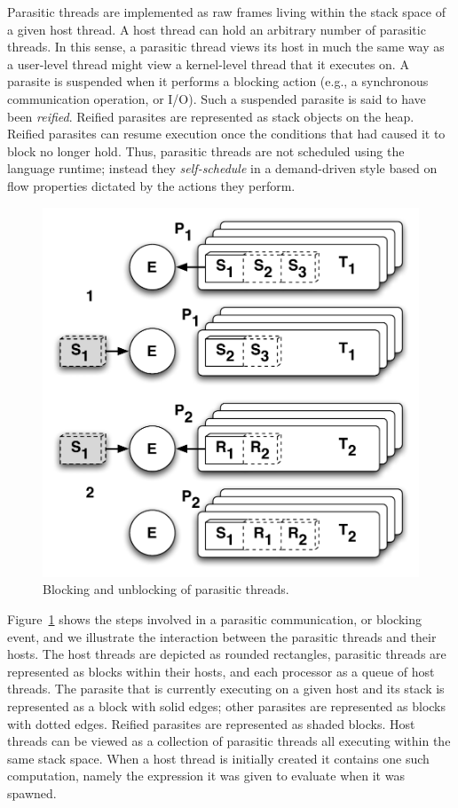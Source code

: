 Parasitic threads are implemented as raw frames living within the stack space
of a given host thread.  A host thread can hold an arbitrary number of
parasitic threads. In this sense, a parasitic thread views its host in much the
same way as a user-level thread might view a kernel-level thread that it
executes on. A parasite is suspended when it performs a blocking action (e.g.,
a synchronous communication operation, or I/O). Such a suspended parasite is
said to have been \emph{reified}. Reified parasites are represented as stack
objects on the heap. Reified parasites can resume execution once the conditions
that had caused it to block no longer hold. Thus, parasitic threads are not
scheduled using the language runtime; instead they \emph{self-schedule} in a
demand-driven style based on flow properties dictated by the actions they
perform.

\begin{figure}
\begin{center}
\includegraphics[scale=0.5]{Figures/communication.pdf}
\end{center}
\caption{Blocking and unblocking of parasitic threads.}
\label{fig:block_unblock}
\end{figure}

Figure~\ref{fig:block_unblock} shows the steps involved in a parasitic
communication, or blocking event, and we illustrate the interaction between the
parasitic threads and their hosts. The host threads are depicted as rounded
rectangles, parasitic threads are represented as blocks within their hosts, and
each processor as a queue of host threads. The parasite that is currently
executing on a given host and its stack is represented as a block with solid
edges; other parasites are represented as blocks with dotted edges. Reified
parasites are represented as shaded blocks. Host threads can be viewed as a
collection of parasitic threads all executing within the same stack space. When
a host thread is initially created it contains one such computation, namely the
expression it was given to evaluate when it was spawned.

